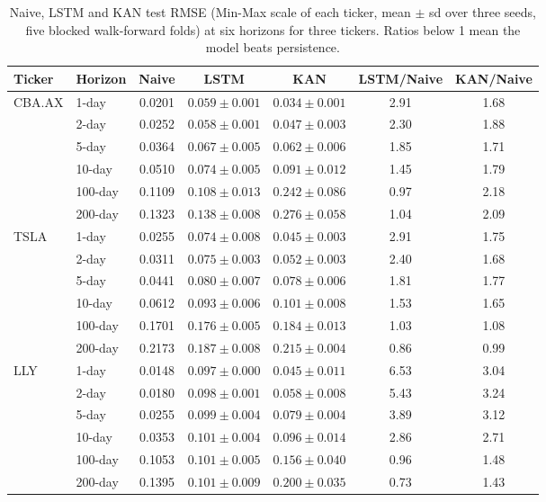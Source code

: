 \begin{table}[!ht]
\centering
\scriptsize
\setlength{\tabcolsep}{4pt}
\begin{tabular}{|l|l|c|c|c|c|c|}
\hline
\textbf{Ticker} & \textbf{Horizon} & \textbf{Naive} & \textbf{LSTM} & \textbf{KAN} & \textbf{LSTM/Naive} & \textbf{KAN/Naive} \\
\hline
  \multirow{6}{*}{CBA.AX} & 1-day & 0.0201 & $0.059 \pm 0.001$ & $0.034 \pm 0.001$ & 2.91 & 1.68 \\
   & 2-day & 0.0252 & $0.058 \pm 0.001$ & $0.047 \pm 0.003$ & 2.30 & 1.88 \\
   & 5-day & 0.0364 & $0.067 \pm 0.005$ & $0.062 \pm 0.006$ & 1.85 & 1.71 \\
   & 10-day & 0.0510 & $0.074 \pm 0.005$ & $0.091 \pm 0.012$ & 1.45 & 1.79 \\
   & 100-day & 0.1109 & $0.108 \pm 0.013$ & $0.242 \pm 0.086$ & 0.97 & 2.18 \\
   & 200-day & 0.1323 & $0.138 \pm 0.008$ & $0.276 \pm 0.058$ & 1.04 & 2.09 \\
\hline
  \multirow{6}{*}{TSLA} & 1-day & 0.0255 & $0.074 \pm 0.008$ & $0.045 \pm 0.003$ & 2.91 & 1.75 \\
   & 2-day & 0.0311 & $0.075 \pm 0.003$ & $0.052 \pm 0.003$ & 2.40 & 1.68 \\
   & 5-day & 0.0441 & $0.080 \pm 0.007$ & $0.078 \pm 0.006$ & 1.81 & 1.77 \\
   & 10-day & 0.0612 & $0.093 \pm 0.006$ & $0.101 \pm 0.008$ & 1.53 & 1.65 \\
   & 100-day & 0.1701 & $0.176 \pm 0.005$ & $0.184 \pm 0.013$ & 1.03 & 1.08 \\
   & 200-day & 0.2173 & $0.187 \pm 0.008$ & $0.215 \pm 0.004$ & 0.86 & 0.99 \\
\hline
  \multirow{6}{*}{LLY} & 1-day & 0.0148 & $0.097 \pm 0.000$ & $0.045 \pm 0.011$ & 6.53 & 3.04 \\
   & 2-day & 0.0180 & $0.098 \pm 0.001$ & $0.058 \pm 0.008$ & 5.43 & 3.24 \\
   & 5-day & 0.0255 & $0.099 \pm 0.004$ & $0.079 \pm 0.004$ & 3.89 & 3.12 \\
   & 10-day & 0.0353 & $0.101 \pm 0.004$ & $0.096 \pm 0.014$ & 2.86 & 2.71 \\
   & 100-day & 0.1053 & $0.101 \pm 0.005$ & $0.156 \pm 0.040$ & 0.96 & 1.48 \\
   & 200-day & 0.1395 & $0.101 \pm 0.009$ & $0.200 \pm 0.035$ & 0.73 & 1.43 \\
\hline
\end{tabular}
\caption{Naive, LSTM and KAN test RMSE (Min-Max scale of each ticker, mean $\pm$ sd over three seeds, five blocked walk-forward folds) at six horizons for three tickers. Ratios below 1 mean the model beats persistence.}
\label{table_multi_ticker}
\end{table}
